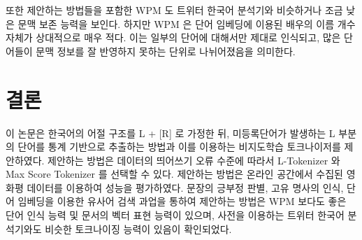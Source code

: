 \documentclass[oneside, ko,phd]{snuthesis_utf8_kor}
\begin{document}
\begin{table}[ht]
\centering
\caption{단어 임베딩 벡터를 이용하여 검색된 배우 이름의 유사어 중 배우 이름인 비율}
\label{tab:word2vec_actor}
\end{table}

또한 제안하는 방법들을 포함한 WPM 도 트위터 한국어 분석기와 비슷하거나 조금 낮은 문맥 보존 능력을 보인다.
하지만 WPM 은 단어 임베딩에 이용된 배우의 이름 개수 자체가 상대적으로 매우 적다.
이는 일부의 단어에 대해서만 제대로 인식되고, 많은 단어들이 문맥 정보를 잘 반영하지 못하는 단위로 나뉘어졌음을 의미한다.


\section{결론} \label{word_extraction_conclusion}
이 논문은 한국어의 어절 구조를 L + [R] 로 가정한 뒤, 미등록단어가 발생하는 L 부분의 단어를 통계 기반으로 추출하는 방법과 이를 이용하는 비지도학습 토크나이저를 제안하였다.
제안하는 방법은 데이터의 띄어쓰기 오류 수준에 따라서 L-Tokenizer 와 Max Score Tokenizer 를 선택할 수 있다.
제안하는 방법은 온라인 공간에서 수집된 영화평 데이터를 이용하여 성능을 평가하였다.
문장의 긍부정 판별, 고유 명사의 인식, 단어 임베딩을 이용한 유사어 검색 과업을 통하여 제안하는 방법은 WPM 보다도 좋은 단어 인식 능력 및 문서의 벡터 표현 능력이 있으며, 사전을 이용하는 트위터 한국어 분석기와도 비슷한 토크나이징 능력이 있음이 확인되었다.
\end{document}
